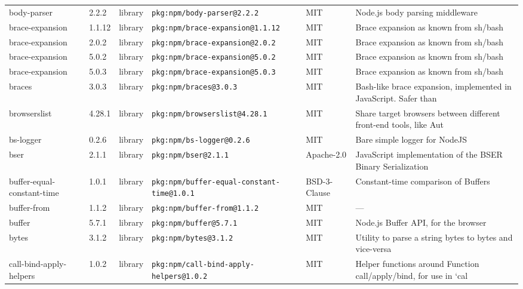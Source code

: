 \documentclass[11pt,a4paper]{article}
\begin{document}
\begin{longtable}{|p{4cm}|p{2cm}|p{1.6cm}|p{5cm}|p{1.5cm}|p{3.5cm}|}
\raggedright body-parser & 2.2.2 & library & \small\texttt{pkg:npm/body-parser@2.2.2} & MIT & \small Node.js body parsing middleware \\
\raggedright brace-expansion & 1.1.12 & library & \small\texttt{pkg:npm/brace-expansion@1.1.12} & MIT & \small Brace expansion as known from sh/bash \\
\raggedright brace-expansion & 2.0.2 & library & \small\texttt{pkg:npm/brace-expansion@2.0.2} & MIT & \small Brace expansion as known from sh/bash \\
\raggedright brace-expansion & 5.0.2 & library & \small\texttt{pkg:npm/brace-expansion@5.0.2} & MIT & \small Brace expansion as known from sh/bash \\
\raggedright brace-expansion & 5.0.3 & library & \small\texttt{pkg:npm/brace-expansion@5.0.3} & MIT & \small Brace expansion as known from sh/bash \\
\raggedright braces & 3.0.3 & library & \small\texttt{pkg:npm/braces@3.0.3} & MIT & \small Bash-like brace expansion, implemented in JavaScript. Safer than  \\
\raggedright browserslist & 4.28.1 & library & \small\texttt{pkg:npm/browserslist@4.28.1} & MIT & \small Share target browsers between different front-end tools, like Aut \\
\raggedright bs-logger & 0.2.6 & library & \small\texttt{pkg:npm/bs-logger@0.2.6} & MIT & \small Bare simple logger for NodeJS \\
\raggedright bser & 2.1.1 & library & \small\texttt{pkg:npm/bser@2.1.1} & Apache-2.0 & \small JavaScript implementation of the BSER Binary Serialization \\
\raggedright buffer-equal-constant-time & 1.0.1 & library & \small\texttt{pkg:npm/buffer-equal-constant-time@1.0.1} & BSD-3-Clause & \small Constant-time comparison of Buffers \\
\raggedright buffer-from & 1.1.2 & library & \small\texttt{pkg:npm/buffer-from@1.1.2} & MIT & \small — \\
\raggedright buffer & 5.7.1 & library & \small\texttt{pkg:npm/buffer@5.7.1} & MIT & \small Node.js Buffer API, for the browser \\
\raggedright bytes & 3.1.2 & library & \small\texttt{pkg:npm/bytes@3.1.2} & MIT & \small Utility to parse a string bytes to bytes and vice-versa \\
\raggedright call-bind-apply-helpers & 1.0.2 & library & \small\texttt{pkg:npm/call-bind-apply-helpers@1.0.2} & MIT & \small Helper functions around Function call/apply/bind, for use in `cal \\

\end{longtable}
\end{document}
